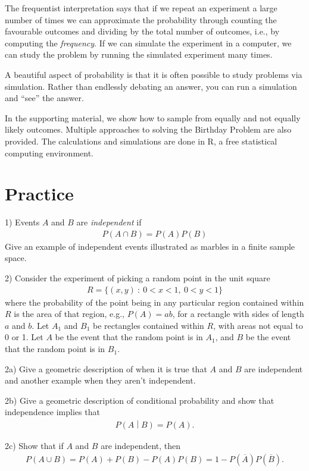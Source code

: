\documentclass[11pt,a4paper]{article}
\begin{document}
The frequentist interpretation says that if we repeat an experiment a large number of times we can
approximate the probability through counting the favourable outcomes and dividing by the total number of outcomes, i.e.,
by computing the \emph{frequency}.
If we can simulate the experiment in a computer, 
we can study the problem by running the simulated experiment many times.

A beautiful aspect of probability is that it is often possible to study problems via simulation. 
Rather than endlessly debating an answer, 
you can run a simulation and ``see'' the answer. 

In the supporting material, 
we show how to sample from equally and not equally likely outcomes. 
Multiple approaches to solving the Birthday Problem are also provided. 
The calculations and simulations are done in R, 
a free statistical computing environment.

\section{Practice}\label{practice}

1) Events \(A\) and \(B\) are \emph{independent} if
\begin{align}
P(A \cap B) = P(A)P(B)
\end{align}
Give an example of independent events illustrated as marbles in a finite
sample space.

2) Consider the experiment of picking a random point in the unit square
\begin{align}
R = \{(x,y)\ :\ 0 < x < 1,\ 0 < y < 1\}
\end{align}
where the probability of the point being in any particular region
contained within \(R\) is the area of that region, e.g., \(P(A) = ab\),
for a rectangle with sides of length \(a\) and \(b\). Let \(A_{1}\) and
\(B_{1}\) be rectangles contained within \(R\), with areas not equal to
0 or 1. Let \(A\) be the event that the random point is in \(A_{1}\),
and \(B\) be the event that the random point is in \(B_{1}\).

2a) Give a geometric description of when it is true that \(A\) and \(B\)
are independent and another example when they aren't independent.

2b) Give a geometric description of conditional probability and show that
independence implies that
\begin{align}
P\left( A \middle| B \right) = P(A).
\end{align}

2c) Show that if \(A\) and \(B\) are independent, then
\begin{align}
P(A \cup B) = P(A) + P(B) - P(A)P(B) = 1 - P\left( \overline{A} \right)P(\overline{B}).
\end{align}
\end{document}
